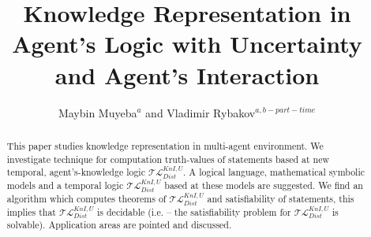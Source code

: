 \documentclass[runningheads]{llncs}
\begin{document}
\title{Knowledge Representation in Agent's Logic with Uncertainty and Agent's Interaction}



\author{Maybin Muyeba$^a$ and Vladimir Rybakov$^{a,b-part-time}$}




\mainmatter

\maketitle









\newcommand{\pos}{\diamondsuit}
\newcommand{\cB}{\mathcal{B}}
\newcommand{\cK}{\mathcal{K}}
\newcommand{\cF}{\mathcal{F}}
\newcommand{\cm}{\mathcal{M}}
\newcommand{\cL}{\mathcal{L}}
\newcommand{\cC}{\mathcal{C}}
\newcommand{\cJ}{\mathcal{J}}
\newcommand{\bbZ}{\mathbb{Z}}
\newcommand{\vv}{\Vdash}
\newcommand{\nn}{\,\mathrm{Next}\,}  \newcommand{\N}{\mathrm{N}\,}        \newcommand{\pp}{\Diamond^+}
\newcommand{\uu}{\,\mathrm{Until}\,}
\newcommand{\und}{\,\&\,}
\newcommand{\Sk} {\mathrm{Sk}}
\newcommand{\Cl}{\mathop{Cl}\nolimits}
\newcommand{\Log}{\mathop{Log}}
\newcommand{\Ref}{\mathop{Ref}}
\newcommand{\Var}{\mathop{Var}}
\newcommand{\dom}{\mathop{dom}}
\newcommand{\Sub}{\mathop{Sub}}
\newcommand{\Fr} {\mathop{Fr}}
\newcommand{\logic}{\mathcal{T\!L}^{KnI,U}_{Dist}}
\newcommand{\llll}{\logic}
\newcommand{\td} {\mathrm{Today}}
\newcommand{\cz} {\mathcal{N}}
\newcommand{\mz} {\mathcal{N_C}}
\newcommand{\rf}[1]{{#1}_{\mathrm{rf}}}
\newcommand{\ppp}{\phi}









\begin{abstract}
This paper studies knowledge representation in multi-agent environment. We
 investigate technique for computation truth-values of statements based at
    new temporal, agent's-knowledge  logic $\logic$. A logical language, mathematical symbolic models and a temporal logic $\logic$ based at these models are suggested.
 We find an algorithm
which computes theorems of $\logic$ and satisfiability of statements, this implies that $\logic$ is
decidable (i.e. --  the satisfiability problem for $\logic$ is solvable).
Application areas are pointed and discussed.
\end{abstract}
\end{document}
